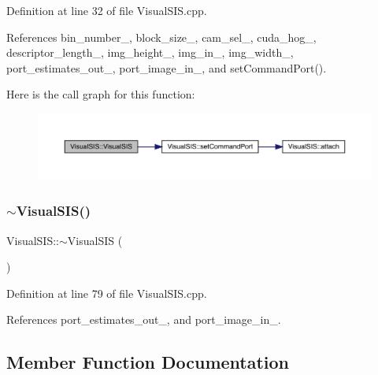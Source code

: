 Definition at line 32 of file Visual\+S\+I\+S.\+cpp.



References bin\+\_\+number\+\_\+, block\+\_\+size\+\_\+, cam\+\_\+sel\+\_\+, cuda\+\_\+hog\+\_\+, descriptor\+\_\+length\+\_\+, img\+\_\+height\+\_\+, img\+\_\+in\+\_\+, img\+\_\+width\+\_\+, port\+\_\+estimates\+\_\+out\+\_\+, port\+\_\+image\+\_\+in\+\_\+, and set\+Command\+Port().

Here is the call graph for this function\+:
\nopagebreak
\begin{figure}[H]
\begin{center}
\leavevmode
\includegraphics[width=350pt]{classVisualSIS_a9088e9979575b7138557bbb02e81c59c_cgraph}
\end{center}
\end{figure}
\mbox{\label{classVisualSIS_a9b57f7b419bd86a4528cbe87e6f53a14}} 
\subsubsection{\texorpdfstring{$\sim$\+Visual\+S\+I\+S()}{~VisualSIS()}}
{\footnotesize\ttfamily Visual\+S\+I\+S\+::$\sim$\+Visual\+S\+IS (\begin{DoxyParamCaption}{ }\end{DoxyParamCaption})\hspace{0.3cm}{\ttfamily [noexcept]}}



Definition at line 79 of file Visual\+S\+I\+S.\+cpp.



References port\+\_\+estimates\+\_\+out\+\_\+, and port\+\_\+image\+\_\+in\+\_\+.



\subsection{Member Function Documentation}
\mbox{\label{classVisualSIS_a2a331e2d6285cb48541df86dcc27b2c1}} 
